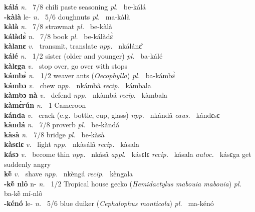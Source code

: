 {\bfseries kálá}  {\itshape n.~} 7/8 chili paste seasoning {\itshape pl.~} be-kálá    \\ 
{\bfseries -kàlà} le- {\itshape n.~} 5/6 doughnuts {\itshape pl.~} ma-kàlà    \\ 
{\bfseries kàlà}  {\itshape n.~} 7/8 strawmat {\itshape pl.~} be-kàlà    \\ 
{\bfseries kálàdɛ̀}  {\itshape n.~} 7/8 book {\itshape pl.~} be-kálàdɛ̀    \\ 
{\bfseries kàlanɛ}  {\itshape v.~} transmit, translate   {\itshape npp.~} nkálánɛ̂  \\ 
{\bfseries kálé}  {\itshape n.~} 1/2 sister (older and younger) {\itshape pl.~} ba-kálé    \\ 
{\bfseries kàlɛga}  {\itshape v.~} stop over, go over with stops    \\ 
{\bfseries kámbɛ̀}  {\itshape n.~} 1/2 weaver ants ({\itshape Oecophylla}) {\itshape pl.~} ba-kámbɛ̀    \\ 
{\bfseries kámbɔ}  {\itshape v.~} chew   {\itshape npp.~} nkámbâ {\itshape recip.~} kámbala  \\ 
{\bfseries kàmbɔ nà}  {\itshape v.~} defend   {\itshape npp.~} nkàmbá {\itshape recip.~} kàmbala  \\ 
{\bfseries kàmɛ̀rún}  {\itshape n.~} 1 Cameroon    \\ 
{\bfseries kánda}  {\itshape v.~} crack  (e.g.\ bottle, cup, glass)   {\itshape npp.~} nkándâ {\itshape caus.~} kándɛsɛ  \\ 
{\bfseries kàndá}  {\itshape n.~} 7/8 proverb {\itshape pl.~} be-kàndá    \\ 
{\bfseries kàsà}  {\itshape n.~} 7/8 bridge {\itshape pl.~} be-kàsà    \\ 
{\bfseries kàsɛlɛ}  {\itshape v.~} light   {\itshape npp.~} nkàsálâ {\itshape recip.~} kàsala  \\ 
{\bfseries kásɔ}  {\itshape v.~} become thin   {\itshape npp.~} nkásâ {\itshape appl.~} kásɛlɛ {\itshape recip.~} kásala {\itshape autoc.~} kásɛga get suddenly angry  \\ 
{\bfseries kẽ̀}  {\itshape v.~} shave   {\itshape npp.~} nkèngá {\itshape recip.~} kèngala \\ 
{\bfseries -kẽ̀ nlô} n- {\itshape n.~} 1/2 Tropical house gecko ({\itshape Hemidactylus mabouia mabouia})  {\itshape pl.~} ba-kẽ̀ mí-nlô    \\ 
{\bfseries -kénó} le- {\itshape n.~} 5/6 blue duiker ({\itshape Cephalophus monticola}) {\itshape pl.~} ma-kénó    \\ 
